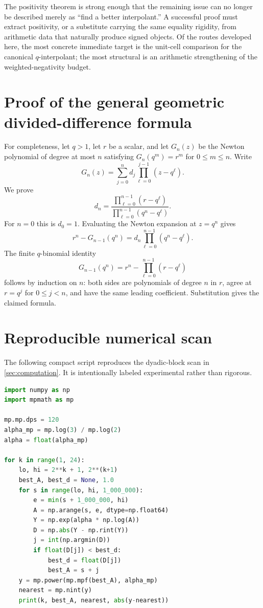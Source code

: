 \documentclass[11pt]{article}
\theoremstyle{definition}
\begin{document}
The positivity theorem is strong enough that the remaining issue can no longer be described merely as ``find a better interpolant.''  A successful proof must extract positivity, or a substitute carrying the same equality rigidity, from arithmetic data that naturally produce signed objects.  Of the routes developed here, the most concrete immediate target is the unit-cell comparison for the canonical $q$-interpolant; the most structural is an arithmetic strengthening of the weighted-negativity budget.

\appendix
\section{Proof of the general geometric divided-difference formula}\label{app:qproof}

For completeness, let $q>1$, let $r$ be a scalar, and let $G_n(z)$ be the Newton polynomial of degree at most $n$ satisfying $G_n(q^m)=r^m$ for $0\le m\le n$.  Write
\[
 G_n(z)=\sum_{j=0}^n d_j\prod_{\ell=0}^{j-1}(z-q^\ell).
\]
We prove
\[
 d_n=\frac{\prod_{\ell=0}^{n-1}(r-q^\ell)}{\prod_{\ell=0}^{n-1}(q^n-q^\ell)}.
\]
For $n=0$ this is $d_0=1$.  Evaluating the Newton expansion at $z=q^n$ gives
\[
 r^n-G_{n-1}(q^n)=d_n\prod_{\ell=0}^{n-1}(q^n-q^\ell).
\]
The finite $q$-binomial identity
\[
 G_{n-1}(q^n)=r^n-\prod_{\ell=0}^{n-1}(r-q^\ell)
\]
follows by induction on $n$: both sides are polynomials of degree $n$ in $r$, agree at $r=q^j$ for $0\le j<n$, and have the same leading coefficient.  Substitution gives the claimed formula.

\section{Reproducible numerical scan}\label{app:code}

The following compact script reproduces the dyadic-block scan in \cref{sec:computation}.  It is intentionally labeled experimental rather than rigorous.

\begin{lstlisting}[language=Python]
import numpy as np
import mpmath as mp

mp.mp.dps = 120
alpha_mp = mp.log(3) / mp.log(2)
alpha = float(alpha_mp)

for k in range(1, 24):
    lo, hi = 2**k + 1, 2**(k+1)
    best_A, best_d = None, 1.0
    for s in range(lo, hi, 1_000_000):
        e = min(s + 1_000_000, hi)
        A = np.arange(s, e, dtype=np.float64)
        Y = np.exp(alpha * np.log(A))
        D = np.abs(Y - np.rint(Y))
        j = int(np.argmin(D))
        if float(D[j]) < best_d:
            best_d = float(D[j])
            best_A = s + j
    y = mp.power(mp.mpf(best_A), alpha_mp)
    nearest = mp.nint(y)
    print(k, best_A, nearest, abs(y-nearest))
\end{lstlisting}
\end{document}
